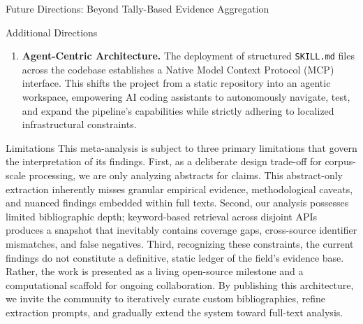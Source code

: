 \documentclass[
  ignorenonframetext,
]{beamer}
\begin{document}
\begin{frame}[fragile]{Future Directions: Beyond Tally-Based Evidence
Aggregation}
\begin{block}{Additional Directions}
\begin{enumerate}
  reveal shared mathematical structures that are currently obscured by
  disciplinary siloing.
\item
  \textbf{Agent-Centric Architecture.} The deployment of structured
  \texttt{SKILL.md} files across the codebase establishes a Native Model
  Context Protocol (MCP) interface. This shifts the project from a
  static repository into an agentic workspace, empowering AI coding
  assistants to autonomously navigate, test, and expand the pipeline's
  capabilities while strictly adhering to localized infrastructural
  constraints.
\end{enumerate}
\end{block}
\end{frame}

\begin{frame}{Limitations}
\protect{}\label{limitations}
This meta-analysis is subject to three primary limitations that govern
the interpretation of its findings. First, as a deliberate design
trade-off for corpus-scale processing, we are only analyzing abstracts
for claims. This abstract-only extraction inherently misses granular
empirical evidence, methodological caveats, and nuanced findings
embedded within full texts. Second, our analysis possesses limited
bibliographic depth; keyword-based retrieval across disjoint APIs
produces a snapshot that inevitably contains coverage gaps, cross-source
identifier mismatches, and false negatives. Third, recognizing these
constraints, the current findings do not constitute a definitive, static
ledger of the field's evidence base. Rather, the work is presented as a
living open-source milestone and a computational scaffold for ongoing
collaboration. By publishing this architecture, we invite the community
to iteratively curate custom bibliographies, refine extraction prompts,
and gradually extend the system toward full-text analysis.
\end{frame}
\end{document}
